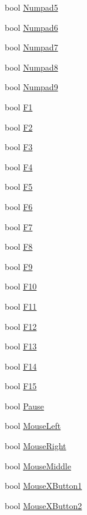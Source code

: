 \begin{DoxyCompactItemize}
\item 
bool \hyperlink{class_update_data_aa01df166ad9278753ae8319c0ea0fae9}{Numpad5}
\item 
bool \hyperlink{class_update_data_a5e0c3e2d191f8740f6f4ef9c8f098916}{Numpad6}
\item 
bool \hyperlink{class_update_data_a602f866169c63ee593e4cc20238fe648}{Numpad7}
\item 
bool \hyperlink{class_update_data_abd545e967b8bb6d2e5fb2ab71677b739}{Numpad8}
\item 
bool \hyperlink{class_update_data_a6b38497b31a69eb643468af86fded6a6}{Numpad9}
\item 
bool \hyperlink{class_update_data_ad801ef2c755c48a0486d1cacff14cf4a}{F1}
\item 
bool \hyperlink{class_update_data_a5595eab7a9e19a7dc8bde85ddec68fea}{F2}
\item 
bool \hyperlink{class_update_data_a2c53432a2425a04591e47cf9a7489f95}{F3}
\item 
bool \hyperlink{class_update_data_a8fa9218520ceddd72a3398b1231ae36c}{F4}
\item 
bool \hyperlink{class_update_data_a5bb98b431ec5db1ab0aed84834323ffa}{F5}
\item 
bool \hyperlink{class_update_data_a8aa4780666e7a2609731b3eb89c243af}{F6}
\item 
bool \hyperlink{class_update_data_a0cbd6602d2f11669e66c57faec214997}{F7}
\item 
bool \hyperlink{class_update_data_a263926a077c495954d0de538ee30007e}{F8}
\item 
bool \hyperlink{class_update_data_a6fc136dffd9520bb9c08ab8cd7f661a2}{F9}
\item 
bool \hyperlink{class_update_data_a63f3685b2726687a8952c4d8c965430b}{F10}
\item 
bool \hyperlink{class_update_data_a881485d57e45ed8757859e8bda0ebe06}{F11}
\item 
bool \hyperlink{class_update_data_a33f361b0b1d584eea65aeba9992e7c8a}{F12}
\item 
bool \hyperlink{class_update_data_a696f3326aa76b2de2c60ed55a8cf8642}{F13}
\item 
bool \hyperlink{class_update_data_a5618e831603e64eb23d88ab75dcb7a20}{F14}
\item 
bool \hyperlink{class_update_data_ad6d7cba6eb77f26fb134042045fbe2ae}{F15}
\item 
bool \hyperlink{class_update_data_adcdb49d1228a4b10c524b5bca4456280}{Pause}
\item 
bool \hyperlink{class_update_data_a5ddf3b9b71362dcd95c2ff19757676e5}{Mouse\-Left}
\item 
bool \hyperlink{class_update_data_a41d911e68f0d2cc391ddd4a65524c2ec}{Mouse\-Right}
\item 
bool \hyperlink{class_update_data_a926da45e4985c73ff69d0e04714a7db3}{Mouse\-Middle}
\item 
bool \hyperlink{class_update_data_a59414c72026dee3258cf6ca0048f4ca7}{Mouse\-X\-Button1}
\item 
bool \hyperlink{class_update_data_a715d9ba330378084d0e88fcf84f819db}{Mouse\-X\-Button2}
\end{DoxyCompactItemize}



